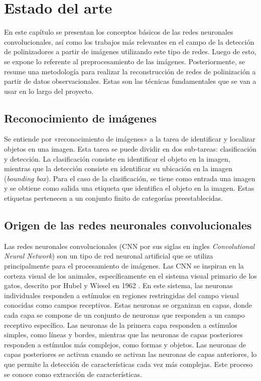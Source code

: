 \chapter{Estado del arte}
\label{chapter:arte}

En este capítulo se presentan los conceptos básicos de las redes neuronales convolucionales, así como los trabajos más relevantes en el campo de la detección de polinizadores a partir de imágenes utilizando este tipo de redes. Luego de esto, se expone lo referente al preprocesamiento de las imágenes. Posteriormente, se resume una metodología para realizar la reconstrucción de redes de polinización a partir de datos observacionales. Estas son las técnicas fundamentales que se van a usar en lo largo del proyecto.

\section{Reconocimiento de imágenes}

Se entiende por «reconocimiento de imágenes» a la tarea de identificar y localizar objetos en una imagen. Esta tarea se puede dividir en dos sub-tareas: clasificación y detección. La clasificación consiste en identificar el objeto en la imagen, mientras que la detección consiste en identificar su ubicación en la imagen (\textit{bounding box}). Para el caso de la clasificación, se tiene como entrada una imagen y se obtiene como salida una etiqueta que identifica el objeto en la imagen. Estas etiquetas pertenecen a un conjunto finito de categorías preestablecidas.

\section{Origen de las redes neuronales convolucionales}

Las redes neuronales convolucionales (CNN por sus siglas en ingles \textit{Convolutional Neural Network}) son un tipo de red neuronal artificial que se utiliza principalmente para el procesamiento de imágenes. Las CNN se inspiran en la corteza visual de los animales, específicamente en el sistema visual primario de los gatos, descrito por Hubel y Wiesel en 1962 \cite{hubel-1962}. En este sistema, las neuronas individuales responden a estímulos en regiones restringidas del campo visual conocidas como campos receptivos. Estas neuronas se organizan en capas, donde cada capa se compone de un conjunto de neuronas que responden a un campo receptivo específico. Las neuronas de la primera capa responden a estímulos simples, como líneas y bordes, mientras que las neuronas de capas posteriores responden a estímulos más complejos, como formas y objetos. Las neuronas de capas posteriores se activan cuando se activan las neuronas de capas anteriores, lo que permite la detección de características cada vez más complejas. Este proceso se conoce como extracción de características.

